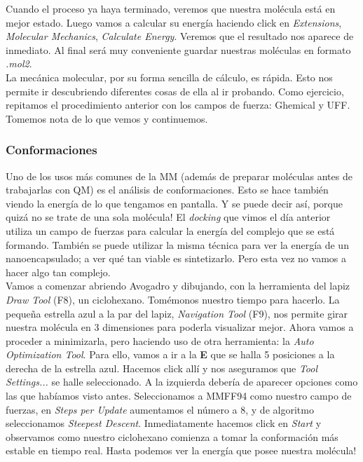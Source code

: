 \documentclass[10pt,letterpaper]{article}
\begin{document}
Cuando el proceso ya haya terminado, veremos que nuestra mol\'ecula est\'a en mejor estado. Luego vamos a calcular su energ\'ia haciendo click en \emph{Extensions}, \emph{Molecular Mechanics}, \emph{Calculate Energy}. Veremos que el resultado nos aparece de inmediato. Al final ser\'a muy conveniente guardar nuestras mol\'eculas en formato \emph{.mol2}.\\

La mec\'anica molecular, por su forma sencilla de c\'alculo, es r\'apida. Esto nos permite ir descubriendo diferentes cosas de ella al ir probando. Como ejercicio, repitamos el procedimiento anterior con los campos de fuerza: Ghemical y UFF. Tomemos nota de lo que vemos y continuemos.

\subsubsection{Conformaciones}
Uno de los usos m\'as comunes de la MM (adem\'as de preparar mol\'eculas antes de trabajarlas con QM) es el an\'alisis de conformaciones. Esto se hace tambi\'en viendo la energ\'ia de lo que tengamos en pantalla. Y se puede decir as\'i, porque quiz\'a no se trate de una sola mol\'ecula! El \emph{docking} que vimos el d\'ia anterior utiliza un campo de fuerzas para calcular la energ\'ia del complejo que se est\'a formando. Tambi\'en se puede utilizar la misma t\'ecnica para ver la energ\'ia de un nanoencapsulado; a ver qu\'e tan viable es sintetizarlo. Pero esta vez no vamos a hacer algo tan complejo.\\

Vamos a comenzar abriendo Avogadro y dibujando, con la herramienta del lapiz \emph{Draw Tool} (F8), un ciclohexano. Tom\'emonos nuestro tiempo para hacerlo. La peque\~na estrella azul a la par del lapiz, \emph{Navigation Tool} (F9), nos permite girar nuestra mol\'ecula en 3 dimensiones para poderla visualizar mejor. Ahora vamos a proceder a minimizarla, pero haciendo uso de otra herramienta: la \emph{Auto Optimization Tool}. Para ello, vamos a ir a la \textbf{E} que se halla 5 posiciones a la derecha de la estrella azul. Hacemos click all\'i y nos aseguramos que \emph{Tool Settings...} se halle seleccionado. A la izquierda deber\'ia de aparecer opciones como las que hab\'iamos visto antes. Seleccionamos a MMFF94 como nuestro campo de fuerzas, en \emph{Steps per Update} aumentamos el n\'umero a 8, y de algoritmo seleccionamos \emph{Steepest Descent}. Inmediatamente hacemos click en \emph{Start} y observamos como nuestro ciclohexano comienza a tomar la conformaci\'on m\'as estable en tiempo real. Hasta podemos ver la energ\'ia que posee nuestra mol\'ecula!\\
\end{document}
